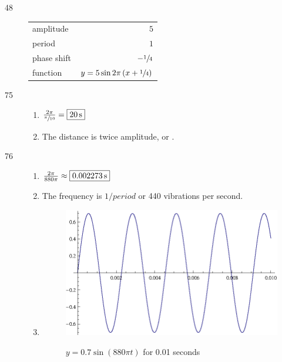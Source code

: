 \documentclass{exam}
\begin{document}
\begin{description}
    \item[48]
      \begin{tabular}[H]{lr}
        \toprule
        amplitude   & $5$ \\
        period      & $1$ \\
        phase shift & $- \sfrac{1}{4}$ \\
        function    & $y = 5 \sin 2 \pi \left( x + \sfrac{1}{4} \right)$ \\
        \bottomrule
      \end{tabular}

    \item[75]
      \begin{enumerate}[a]
        \item $\frac{2 \pi}{\sfrac{\pi}{10}} = \boxed{ \unit[20]{s} }$
        \item The distance is twice amplitude, or .
      \end{enumerate}

    \item[76]
      \begin{enumerate}[a]
        \item $\frac{2 \pi}{880 \pi} \approx \boxed{ \unit[ 0.002273 ]{s} }$
        \item The frequency is $1/period$ or 440 vibrations per second.

        \item
          \begin{figure}[H]
            \centering
            \includegraphics[scale=1.0]{exercise76.eps}

            $y = 0.7 \sin \left( 880 \pi t \right)$ for 0.01 seconds
          \end{figure}

      \end{enumerate}

    \end{description}
\end{document}
